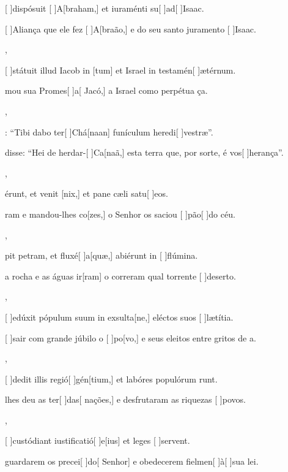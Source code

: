 {    {\item {}[ ]{dis}pósuit [ ]{A}[braham,] et iuraménti su[ ]{ad}[ ]{I}saac.}%
        {\item {}[ ]{A}liança que ele fez [ ]{A}[braão,] e do seu santo juramento [ ]{I}{sa}ac.},
    {\item {}[ ]{stá}tuit illud Iacob in [tum] et Israel in testamén[ ]{æ}{tér}num.}%
        {\item {}mou sua Promes[ ]{a}[ Jacó,] a Israel como perpétua ça.},
    {\item {}: ``Tibi dabo ter[ ]{Chá}[naan] funículum heredi[ ]{ve}stræ''.}%
        {\item {} disse: ``Hei de herdar-[ ]{Ca}[naã,] esta terra que, por sorte, é vos[ ]{he}{ran}ça''.},
    {\item {}érunt, et venit [nix,] et pane cæli satu[ ]{e}os.}%
        {\item {}ram e mandou-lhes co[zes,] o Senhor os saciou [ ]{pão}[ ]{do} céu.},
    {\item {}pit petram, et fluxé[ ]{a}[quæ,] abiérunt in [ ]{flú}mina.}%
        {\item {} a rocha e as águas ir[ram] o correram qual torrente [ ]{de}{ser}to.},
    {\item {}[ ]{e}dúxit pópulum suum in exsulta[ne,] eléctos suos [ ]{læ}{tí}tia.}%
        {\item {}[ ]{sa}ir com grande júbilo o [ ]{po}[vo,] e seus eleitos entre gritos de a.},
    {\item {}[ ]{de}dit illis regió[ ]{gén}[tium,] et labóres populórum runt.}%
        {\item {} lhes deu as ter[ ]{das}[ nações,] e desfrutaram as riquezas [ ]{po}vos.},
    {\item {}[ ]{cu}stódiant iustificatió[ ]{e}[ius] et leges [ ]{ser}\-vent.}%
        {\item {} guardarem os precei[ ]{do}[ Senhor] e obedecerem fielmen[ ]{à}[ ]{su}a lei.}
}